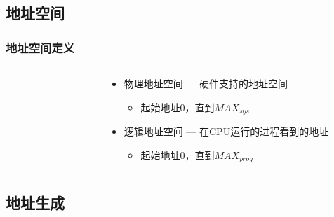 \subsection{地址空间} %
\begin{frame}[plain,t]
    \frametitle{地址空间定义}
    \begin{columns}
        \begin{column}{0.5\textwidth}
		    \begin{figure}
		        \centering
		    \end{figure}
        \end{column}
        \begin{column}{0.5\textwidth}
			\begin{itemize}
			    \item 物理地址空间 — 硬件支持的地址空间
			    \begin{itemize}
				    \item 起始地址0，直到\begin{math}MAX_{sys}\end{math}
			    \end{itemize}
			    \item 逻辑地址空间 — 在CPU运行的进程看到的地址
			    \begin{itemize}
			        \item 起始地址0，直到\begin{math}MAX_{prog}\end{math}
			    \end{itemize}
			\end{itemize}
        \end{column}
    \end{columns}
\end{frame}

\subsection{地址生成} %

